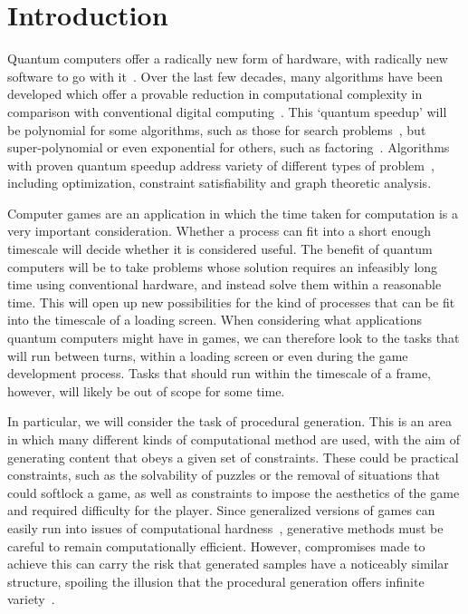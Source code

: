 \documentclass[conference]{IEEEtran}
\begin{document}
\section{Introduction}

Quantum computers offer a radically new form of hardware, with radically new software to go with it~\cite{benioff,feynman,ike-mike}. Over the last few decades, many algorithms have been developed which offer a provable reduction in computational complexity in comparison with conventional digital computing~\cite{deutsch,montanaro}. This `quantum speedup' will be polynomial for some algorithms, such as those for search problems~\cite{grover}, but super-polynomial or even exponential for others, such as factoring~\cite{shor}. Algorithms with proven quantum speedup address variety of different types of problem~\cite{algorithm-zoo,qiskit-textbook}, including optimization, constraint satisfiability and graph theoretic analysis.

Computer games are an application in which the time taken for computation is a very important consideration. Whether a process can fit into a short enough timescale will decide whether it is considered useful. The benefit of quantum computers will be to take problems whose solution requires an infeasibly long time using conventional hardware, and instead solve them within a reasonable time. This will open up new possibilities for the kind of processes that can be fit into the timescale of a loading screen. When considering what applications quantum computers might have in games, we can therefore look to the tasks that will run between turns, within a loading screen or even during the game development process. Tasks that should run within the timescale of a frame, however, will likely be out of scope for some time.

In particular, we will consider the task of procedural generation. This is an area in which many different kinds of computational method are used, with the aim of generating content that obeys a given set of constraints. These could be practical constraints, such as the solvability of puzzles or the removal of situations that could softlock a game, as well as constraints to impose the aesthetics of the game and required difficulty for the player. Since generalized versions of games can easily run into issues of computational hardness~\cite{aloupis:14}, generative methods must be careful to remain computationally efficient. However, compromises made to achieve this can carry the risk that generated samples have a noticeably similar structure, spoiling the illusion that the procedural generation offers infinite variety~\cite{backus:17}.
\end{document}
